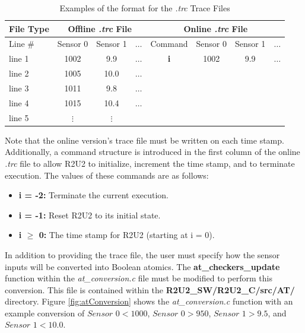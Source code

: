 \begin{table}[H]
	\caption{Examples of the format for the \textit{.trc} Trace Files}
	\label{SensorFileTable}
	\begin{center}
	\begin{tabular}{l | ccc | cccc}
		\hline
		\hline
		\textbf{File Type} & \multicolumn{3}{c|}{\textbf{Offline \textit{.trc} File}} & \multicolumn{4}{c}{\textbf{Online \textit{.trc} File}}\\
		\hline
		Line \# & Sensor 0 & Sensor 1 & $\dots$ & Command & Sensor 0 & Sensor 1 & $\dots$\\
		\hline
		line 1 & 1002 &  9.9 & $\dots$ & \textbf{i} & 1002 &  9.9 & $\dots$\\
		line 2 & 1005 & 10.0 & $\dots$ \\
		line 3 & 1011 &  9.8 & $\dots$ \\
		line 4 & 1015 & 10.4 & $\dots$ \\
		line 5 & $\vdots$ & $\vdots$ & \\
		\hline
		\hline
	\end{tabular}
	\end{center}
\end{table}
Note that the online version's trace file must be written on each time stamp. Additionally, a command structure is introduced in the first column of the online \textit{.trc} file to allow R2U2 to initialize, increment the time stamp, and to terminate execution. The values of these commands are as follows:
\begin{itemize}
	\item \textbf{i = -2:} Terminate the current execution.
	\item \textbf{i = -1:} Reset R2U2 to its initial state.
	\item \textbf{i $\geq$ 0:} The time stamp for R2U2 (starting at i = 0).
\end{itemize}

In addition to providing the trace file, the user must specify how the sensor inputs will be converted into Boolean atomics. The \textbf{at\_checkers\_update} function  within the \textit{at\_conversion.c} file must be modified to perform this conversion. This file is contained within the \textbf{R2U2\_SW/R2U2\_C/src/AT/} directory. Figure \ref{fig:atConversion} shows the \textit{at\_conversion.c} function with an example conversion of $\textit{Sensor 0}<1000$, $\textit{Sensor 0}>950$, $\textit{Sensor 1}>9.5$, and $\textit{Sensor 1}<10.0$.

